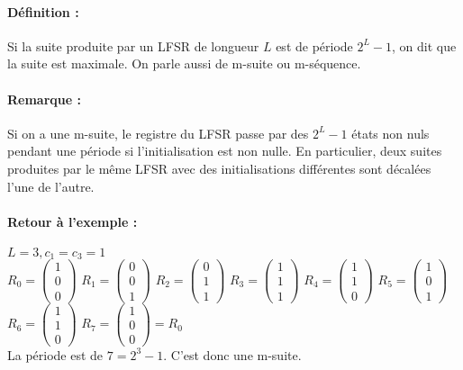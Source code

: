 \documentclass[12pt,a4paper]{report}
\begin{document}
\paragraph{Définition :\\}
Si la suite produite par un LFSR de longueur $L$ est de période $2^L-1$, on dit que la suite est maximale. On parle aussi de m-suite ou m-séquence. 
\paragraph{Remarque :\\}
Si on a une m-suite, le registre du LFSR passe par des $2^L-1$ états non nuls pendant une période si l'initialisation est non nulle. En particulier, deux suites produites par le même LFSR avec des initialisations différentes sont décalées l'une de l'autre.

\paragraph{Retour à l'exemple : }$L=3, c_1=c_3=1$ \\
$R_0 = \left( \begin{array}{c}
1 \\
0 \\
0 \end{array}\right)$
$R_1 = \left( \begin{array}{c}
0 \\
0 \\
1 \end{array}\right)$
$R_2 = \left( \begin{array}{c}
0 \\
1 \\
1 \end{array}\right)$
$R_3 = \left( \begin{array}{c}
1 \\
1 \\
1 \end{array}\right)$
$R_4 = \left( \begin{array}{c}
1 \\
1 \\
0 \end{array}\right)$
$R_5 = \left( \begin{array}{c}
1 \\
0 \\
1 \end{array}\right)$
$R_6 = \left( \begin{array}{c}
1 \\
1 \\
0 \end{array}\right)$
$R_7 = \left( \begin{array}{c}
1 \\
0 \\
0 \end{array}\right) = R_0 $\\
La période est de $7 = 2^3-1$. C'est donc une m-suite.
\end{document}
